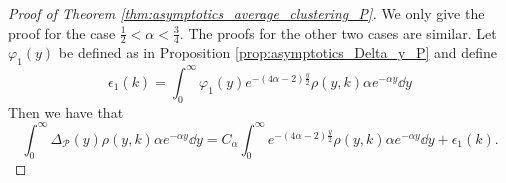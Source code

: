 \begin{proof}[Proof of Theorem \ref{thm:asymptotics_average_clustering_P}]

We only give the proof for the case $\frac{1}{2} < \alpha < \frac{3}{4}$.  The proofs for the other two cases are similar. Let $\varphi_1(y)$ be defined as in Proposition \ref{prop:asymptotics_Delta_y_P} and define
\[
	\epsilon_1(k) = \int_0^{\infty} \varphi_1(y) e^{-(4\alpha - 2)\frac{y}{2}} \rho(y,k) \alpha e^{-\alpha y} \dd y
\]
Then we have that
\[
	\int_0^{\infty} \Delta_{\mathcal{P}}(y) \rho(y,k) \alpha e^{-\alpha y} \dd y
	= C_\alpha \int_0^{\infty} e^{-(4\alpha - 2)\frac{y}{2}} \rho(y,k) \alpha e^{-\alpha y} \dd y + \epsilon_1(k).
\]


\end{proof}

